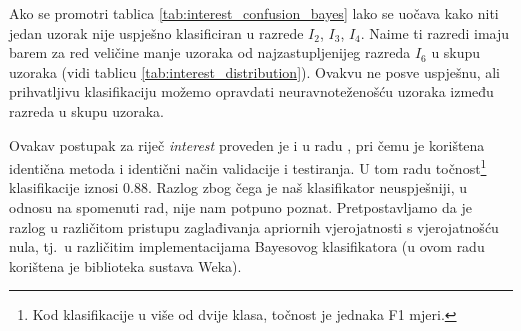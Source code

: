 \documentclass[10pt, a4paper]{article}
\begin{document}
Ako se promotri tablica \ref{tab:interest_confusion_bayes} lako se uočava
kako niti jedan uzorak nije uspješno klasificiran u razrede $I_2$, $I_3$, $I_4$.
Naime ti razredi imaju barem za red veličine manje uzoraka od najzastupljenijeg razreda $I_6$
u skupu uzoraka (vidi tablicu \ref{tab:interest_distribution}). Ovakvu ne posve
uspješnu, ali prihvatljivu klasifikaciju možemo opravdati neuravnoteženošću uzoraka
između razreda u skupu uzoraka.

Ovakav postupak za riječ \emph{interest} proveden je i u radu \citep{pedersen}, pri
čemu je korištena identična metoda i identični način validacije i testiranja. 
U tom radu točnost\footnote{Kod klasifikacije u više od dvije klasa, točnost je jednaka F1 mjeri.} klasifikacije iznosi $0.88$. 
Razlog zbog čega je naš klasifikator neuspješniji, u odnosu na spomenuti rad, nije nam 
potpuno poznat. Pretpostavljamo da je razlog u različitom pristupu zaglađivanja
apriornih vjerojatnosti s vjerojatnošću nula, tj.~u različitim
implementacijama Bayesovog klasifikatora (u ovom radu korištena
je biblioteka sustava Weka). 
\end{document}
